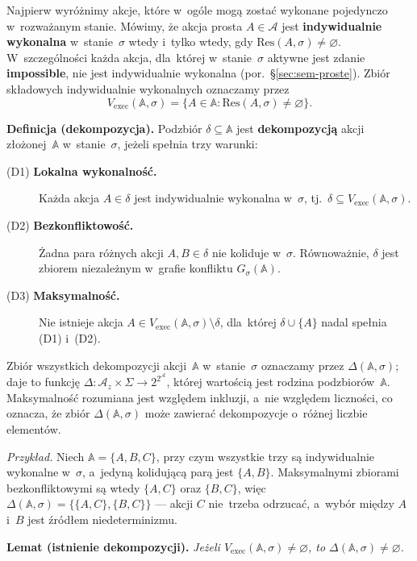 \documentclass[11pt,a4paper]{article}
\newcommand{\impossible}{\textbf{impossible}}
\theoremstyle{definition}
\begin{document}
Najpierw wyróżnimy akcje, które w~ogóle mogą zostać wykonane pojedynczo
w~rozważanym stanie. Mówimy, że akcja prosta $A \in \mathcal{A}$ jest
\textbf{indywidualnie wykonalna} w~stanie~$\sigma$ wtedy i~tylko wtedy,
gdy $\mathrm{Res}(A,\sigma) \neq \varnothing$. W~szczególności każda
akcja, dla~której w~stanie~$\sigma$ aktywne jest zdanie \impossible{},
nie jest indywidualnie wykonalna (por.~\S\ref{sec:sem-proste}). Zbiór składowych
indywidualnie wykonalnych oznaczamy przez
\[
  V_{\mathrm{exec}}(\mathbb{A},\sigma)
    = \{A \in \mathbb{A} : \mathrm{Res}(A,\sigma) \neq \varnothing\}.
\]

\medskip
\noindent \textbf{Definicja (dekompozycja).}
Podzbiór $\delta \subseteq \mathbb{A}$ jest \textbf{dekompozycją} akcji
złożonej~$\mathbb{A}$ w~stanie~$\sigma$, jeżeli spełnia trzy warunki:
\begin{description}
  \item[(D1) \textbf{Lokalna wykonalność.}]
        Każda akcja $A \in \delta$ jest indywidualnie wykonalna w~$\sigma$,
        tj.\ $\delta \subseteq V_{\mathrm{exec}}(\mathbb{A},\sigma)$.
  \item[(D2) \textbf{Bezkonfliktowość.}]
        Żadna para różnych akcji $A, B \in \delta$ nie koliduje w~$\sigma$.
        Równoważnie, $\delta$ jest zbiorem niezależnym w~grafie konfliktu
        $G_\sigma(\mathbb{A})$.
  \item[(D3) \textbf{Maksymalność.}]
        Nie istnieje akcja $A \in V_{\mathrm{exec}}(\mathbb{A},\sigma) \setminus \delta$,
        dla~której $\delta \cup \{A\}$ nadal spełnia (D1) i~(D2).
\end{description}
Zbiór wszystkich dekompozycji akcji~$\mathbb{A}$ w~stanie~$\sigma$
oznaczamy przez $\Delta(\mathbb{A},\sigma)$; daje to funkcję
$\Delta : \mathcal{A}_z \times \Sigma \to 2^{2^{\mathcal{A}}}$, której wartością jest rodzina
podzbiorów~$\mathbb{A}$. Maksymalność rozumiana jest
względem inkluzji, a~nie względem liczności, co oznacza, że zbiór
$\Delta(\mathbb{A},\sigma)$ może zawierać dekompozycje o~różnej liczbie
elementów.

\smallskip\noindent\emph{Przykład.}
Niech $\mathbb{A}=\{A,B,C\}$, przy czym wszystkie trzy są indywidualnie wykonalne
w~$\sigma$, a~jedyną kolidującą parą jest $\{A,B\}$. Maksymalnymi zbiorami
bezkonfliktowymi są wtedy $\{A,C\}$ oraz $\{B,C\}$, więc
$\Delta(\mathbb{A},\sigma)=\{\{A,C\},\{B,C\}\}$ --- akcji $C$ nie~trzeba odrzucać,
a~wybór między $A$ i~$B$ jest źródłem niedeterminizmu.

\medskip
\noindent \textbf{Lemat (istnienie dekompozycji).}
\emph{Jeżeli $V_{\mathrm{exec}}(\mathbb{A},\sigma) \neq \varnothing$, to
$\Delta(\mathbb{A},\sigma) \neq \varnothing$.}
\end{document}
